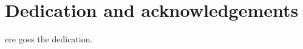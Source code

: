 %
%

\chapter*{Dedication and acknowledgements}
\begin{SingleSpace}
ere goes the dedication. \lipsum[8]
\end{SingleSpace}
\clearpage